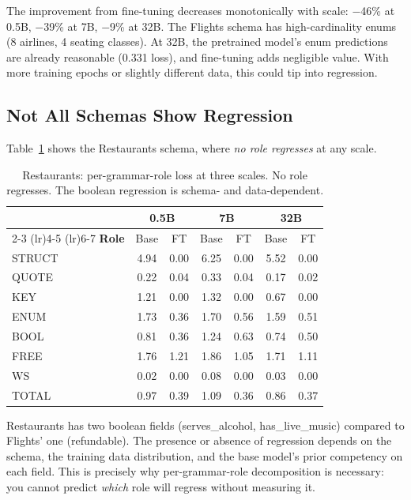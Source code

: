 \documentclass[11pt]{article}
\begin{document}
The improvement from fine-tuning decreases monotonically with scale: $-$46\% at 0.5B, $-$39\% at 7B, $-$9\% at 32B. The Flights schema has high-cardinality enums (8 airlines, 4 seating classes). At 32B, the pretrained model's enum predictions are already reasonable (0.331 loss), and fine-tuning adds negligible value. With more training epochs or slightly different data, this could tip into regression.

\subsection{Not All Schemas Show Regression}

Table~\ref{tab:restaurants_decomp} shows the Restaurants schema, where \emph{no role regresses} at any scale.

\begin{table}[t]
\centering
\small
\begin{tabular}{lcccccc}
\toprule
 & \multicolumn{2}{c}{\textbf{0.5B}} & \multicolumn{2}{c}{\textbf{7B}} & \multicolumn{2}{c}{\textbf{32B}} \\
\cmidrule(lr){2-3} \cmidrule(lr){4-5} \cmidrule(lr){6-7}
\textbf{Role} & Base & FT & Base & FT & Base & FT \\
\midrule
STRUCT  & 4.94 & 0.00 & 6.25 & 0.00 & 5.52 & 0.00 \\
QUOTE   & 0.22 & 0.04 & 0.33 & 0.04 & 0.17 & 0.02 \\
KEY     & 1.21 & 0.00 & 1.32 & 0.00 & 0.67 & 0.00 \\
ENUM    & 1.73 & 0.36 & 1.70 & 0.56 & 1.59 & 0.51 \\
BOOL    & 0.81 & 0.36 & 1.24 & 0.63 & 0.74 & 0.50 \\
FREE    & 1.76 & 1.21 & 1.86 & 1.05 & 1.71 & 1.11 \\
WS      & 0.02 & 0.00 & 0.08 & 0.00 & 0.03 & 0.00 \\
\midrule
TOTAL   & 0.97 & 0.39 & 1.09 & 0.36 & 0.86 & 0.37 \\
\bottomrule
\end{tabular}
\caption{Restaurants: per-grammar-role loss at three scales. No role regresses. The boolean regression is schema- and data-dependent.}
\label{tab:restaurants_decomp}
\end{table}

Restaurants has two boolean fields (serves\_alcohol, has\_live\_music) compared to Flights' one (refundable). The presence or absence of regression depends on the schema, the training data distribution, and the base model's prior competency on each field. This is precisely why per-grammar-role decomposition is necessary: you cannot predict \emph{which} role will regress without measuring it.
\end{document}
